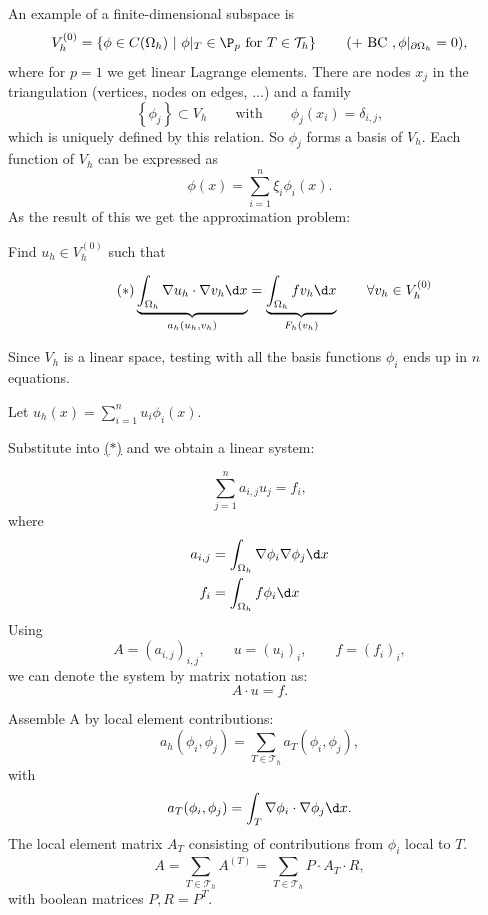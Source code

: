 An example of a finite-dimensional subspace is
\[
	V_{h}^{(0)} = \left\{ \phi \in C(\Omega _{h})\ |\ \phi|_{T} \in \P_{p} \text{ for } T \in \mathcal{T}_{h} \right\} \qquad (+ \text{ BC }, \phi|_{\partial \Omega _{h}}=0)
,\] 
where for $p=1$ we get linear Lagrange elements.
There are nodes $x_{j}$ in the triangulation (vertices, nodes on edges, $\ldots $) and a family
\[
	\left\{ \phi_{j} \right\} \subset V_{h} \qquad \text{with}\qquad \phi_{j}(x_{i}) = \delta_{i,j}
,\] 
which is uniquely defined by this relation.
So $\phi_{j}$ forms a basis of $V_{h}$.
Each function of $V_{h}$ can be expressed as
\[
	\phi(x) = \sum_{i=1}^{n}{\xi _{i}\phi_{i}(x)}
.\] 
As the result of this we get the approximation problem:

Find $u_{h} \in V_{h}^{(0)}$ such that

\begin{equation}\label{eq:discreteproblem}\tag{$\ast$}
	\underbrace{\int_{\Omega _{h}}\nabla u_{h}\cdot \nabla v_{h} \d x}_{a_{h}(u_{h},v_{h})} 
	=
	\underbrace{\int_{\Omega _{h}}f v_{h} \d x}_{F_{h}(v_{h})}  \qquad \forall v_{h} \in V_{h}^{(0)}
\end{equation}

Since $V_{h}$ is a linear space, testing with all the basis functions $\phi _{i}$ ends up in $n$ equations.

Let $u_{h}(x) = \sum_{i=1}^{n}{u_{i}\phi _{i}(x)}$.

Substitute into \href{eq:discreteproblem}{($\ast$)} and we obtain a linear system:

\[
\sum_{j=1}^{n}{a_{i,j}u_{j}=f_{i}}
,\] 
where
\begin{align*}
	a_{i,j}&= \int_{\Omega _{h}}\nabla \phi _{i}\nabla \phi _{j} \d x \\
f_{i}&=\int_{\Omega _{h}}f \phi _{i} \d x
\end{align*}
Using
\[
	A = (a_{i,j})_{i,j}, \qquad u=(u_{i})_{i}, \qquad f=(f_{i})_{i}
,\] 
we can denote the system by matrix notation as:
\[
A \cdot u = f
.\] 

Assemble A by local element contributions:
\[
	a_{h}(\phi _{i}, \phi _{j}) = \sum_{T \in \mathcal{T}_{h}}^{}{a_{T}(\phi _{i}, \phi _{j})}
,\] 
with
\[
	a_{T}(\phi _{i}, \phi _{j}) = \int_{T}\nabla \phi _{i}\cdot \nabla \phi _{j} \d x
.\]
The local element matrix $A_{T}$ consisting of contributions from $\phi _{i}$ local to $T$.
\[
	A = \sum_{T \in \mathcal{T}_{h}}^{}{A^{(T)}}= \sum_{T \in \mathcal{T}_{h}}^{}{P\cdot A_{T} \cdot R}
,\] 
with boolean matrices $P, R = P^{T}$.

